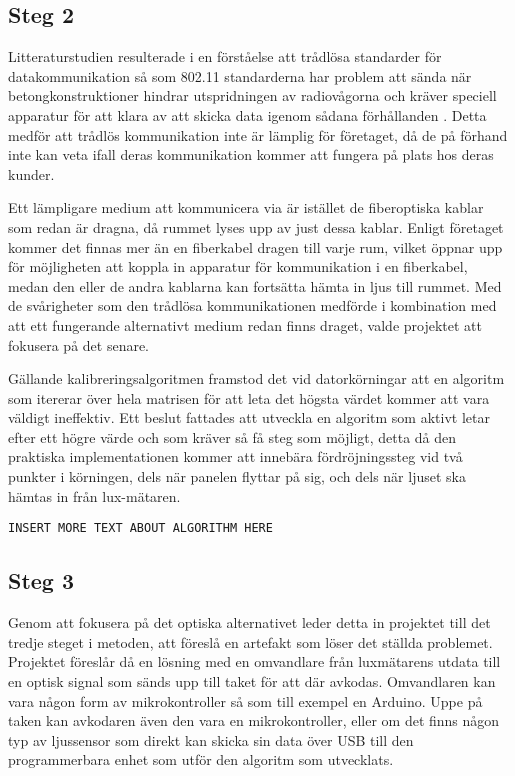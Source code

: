     \subsection{Steg 2} %
    \label{sub:steg_2}
        Litteraturstudien resulterade i en förståelse att trådlösa standarder för datakommunikation så som 802.11 standarderna har problem att sända när betongkonstruktioner hindrar utspridningen av radiovågorna och kräver speciell apparatur för att klara av att skicka data igenom sådana förhållanden \cite{11n}. Detta medför att trådlös kommunikation inte är lämplig för företaget, då de på förhand inte kan veta ifall deras kommunikation kommer att fungera på plats hos deras kunder. \bigskip

        Ett lämpligare medium att kommunicera via är istället de fiberoptiska kablar som redan är dragna, då rummet lyses upp av just dessa kablar. Enligt företaget kommer det finnas mer än en fiberkabel dragen till varje rum, vilket öppnar upp för möjligheten att koppla in apparatur för kommunikation i en fiberkabel, medan den eller de andra kablarna kan fortsätta hämta in ljus till rummet. Med de svårigheter som den trådlösa kommunikationen medförde i kombination med att ett fungerande alternativt medium redan finns draget, valde projektet att fokusera på det senare. \bigskip

        Gällande kalibreringsalgoritmen framstod det vid datorkörningar att en algoritm som itererar över hela matrisen för att leta det högsta värdet kommer att vara väldigt ineffektiv. Ett beslut fattades att utveckla en algoritm som aktivt letar efter ett högre värde och som kräver så få steg som möjligt, detta då den praktiska implementationen kommer att innebära fördröjningssteg vid två punkter i körningen, dels när panelen flyttar på sig, och dels när ljuset ska hämtas in från lux-mätaren.

        \texttt{INSERT MORE TEXT ABOUT ALGORITHM HERE} \bigskip


    \subsection{Steg 3} %
    \label{sub:steg_3}
        Genom att fokusera på det optiska alternativet leder detta in projektet till det tredje steget i metoden, att föreslå en artefakt som löser det ställda problemet. Projektet föreslår då en lösning med en omvandlare från luxmätarens utdata till en optisk signal som sänds upp till taket för att där avkodas. Omvandlaren kan vara någon form av mikrokontroller så som till exempel en Arduino. Uppe på taken kan avkodaren även den vara en mikrokontroller, eller om det finns någon typ av ljussensor som direkt kan skicka sin data över USB till den programmerbara enhet som utför den algoritm som utvecklats. \bigskip

